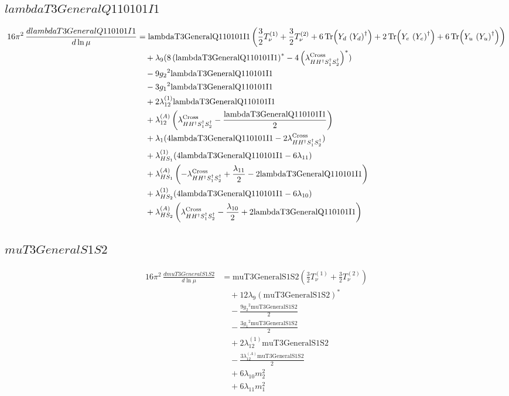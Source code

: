 \documentclass[10pt,a4paper]{article}
\begin{document}
\subsection*{$lambdaT3GeneralQ110101I1$}
\begin{align*}
16\pi^2\,\frac{d lambdaT3GeneralQ110101I1}{d\ln\mu} &=\text{lambdaT3GeneralQ110101I1} \left(\frac{3}{2} T_{\nu}^{(1)}+\frac{3}{2} T_{\nu}^{(2)}+6 \operatorname{Tr}\!\left({Y_d}\,\left({Y_d}\right)^{\dagger}\right)+2 \operatorname{Tr}\!\left({Y_e}\,\left({Y_e}\right)^{\dagger}\right)+6 \operatorname{Tr}\!\left({Y_u}\,\left({Y_u}\right)^{\dagger}\right)\right) \\
&\quad +{\lambda_{9}} (8 \left(\text{lambdaT3GeneralQ110101I1}\right)^{*}-4 \left({\lambda_{H H^\dagger S_1^\dagger S_2^\dagger}^{\rm Cross}}\right)^{*}) \\
&\quad -9 {g_2}^2 \text{lambdaT3GeneralQ110101I1} \\
&\quad -3 {g_1}^2 \text{lambdaT3GeneralQ110101I1} \\
&\quad +2 {\lambda_{12}^{(1)}} \text{lambdaT3GeneralQ110101I1} \\
&\quad +{\lambda_{12}^{(A)}} \left({\lambda_{H H^\dagger S_1^\dagger S_2^\dagger}^{\rm Cross}}-\frac{\text{lambdaT3GeneralQ110101I1}}{2}\right) \\
&\quad +{\lambda_1} (4 \text{lambdaT3GeneralQ110101I1}-2 {\lambda_{H H^\dagger S_1^\dagger S_2^\dagger}^{\rm Cross}}) \\
&\quad +{\lambda_{HS_1}^{(1)}} (4 \text{lambdaT3GeneralQ110101I1}-6 {\lambda_{11}}) \\
&\quad +{\lambda_{HS_1}^{(A)}} \left(-{\lambda_{H H^\dagger S_1^\dagger S_2^\dagger}^{\rm Cross}}+\frac{{\lambda_{11}}}{2}-2 \text{lambdaT3GeneralQ110101I1}\right) \\
&\quad +{\lambda_{HS_2}^{(1)}} (4 \text{lambdaT3GeneralQ110101I1}-6 {\lambda_{10}}) \\
&\quad +{\lambda_{HS_2}^{(A)}} \left({\lambda_{H H^\dagger S_1^\dagger S_2^\dagger}^{\rm Cross}}-\frac{{\lambda_{10}}}{2}+2 \text{lambdaT3GeneralQ110101I1}\right) \\
\end{align*}
\subsection*{$muT3GeneralS1S2$}
\begin{align*}
16\pi^2\,\frac{d muT3GeneralS1S2}{d\ln\mu} &=\text{muT3GeneralS1S2} \left(\frac{3}{2} T_{\nu}^{(1)}+\frac{3}{2} T_{\nu}^{(2)}\right) \\
&\quad +12 {\lambda_{9}} \left(\text{muT3GeneralS1S2}\right)^{*} \\
&\quad -\frac{9 {g_2}^2 \text{muT3GeneralS1S2}}{2} \\
&\quad -\frac{3 {g_1}^2 \text{muT3GeneralS1S2}}{2} \\
&\quad +2 {\lambda_{12}^{(1)}} \text{muT3GeneralS1S2} \\
&\quad -\frac{3 {\lambda_{12}^{(A)}} \text{muT3GeneralS1S2}}{2} \\
&\quad +6 {\lambda_{10}} {m_2^2} \\
&\quad +6 {\lambda_{11}} {m_1^2} \\
\end{align*}
\end{document}
